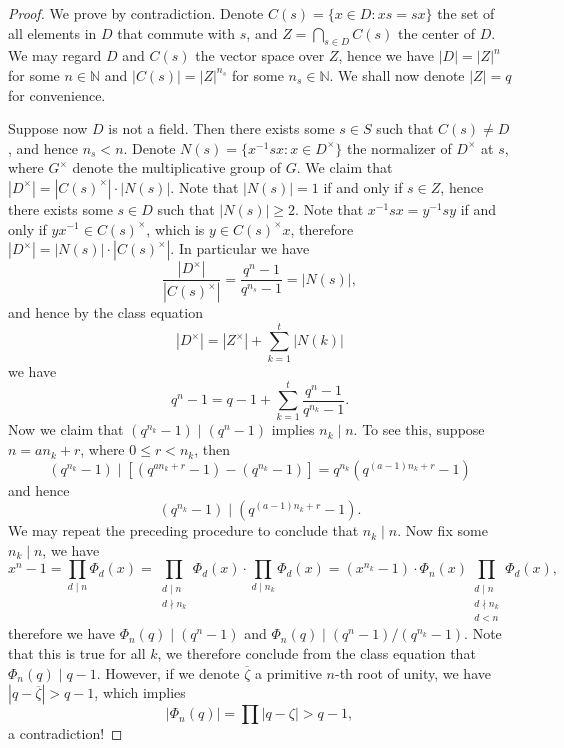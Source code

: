 \begin{proof}
We prove by contradiction. Denote $C(s)=\{x\in D:xs=sx\}$ the set of all elements in $D$ that commute with $s$, and $Z=\bigcap_{s\in D}C(s)$ the center of $D$. We may regard $D$ and $C(s)$ the vector space over $Z$, hence we have $|D|=|Z|^n$ for some $n\in\mathbb{N}$ and $|C(s)|=|Z|^{n_s}$ for some $n_s\in\mathbb{N}$. We shall now denote $|Z|=q$ for convenience.\par
Suppose now $D$ is not a field. Then there exists some $s\in S$ such that $C(s)\ne D$, and hence $n_s<n$. Denote $N(s)=\{x^{-1}sx:x\in D^\times\}$ the normalizer of $D^\times$ at $s$, where $G^\times$ denote the multiplicative group of $G$. We claim that $|D^\times|=|C(s)^\times|\cdot|N(s)|$. Note that $|N(s)|=1$ if and only if $s\in Z$, hence there exists some $s\in D$ such that $|N(s)|\ge 2$. Note that $x^{-1}sx=y^{-1}sy$ if and only if $yx^{-1}\in C(s)^\times$, which is $y\in C(s)^\times x$, therefore $|D^\times|=|N(s)|\cdot|C(s)^\times|$. In particular we have 
$$
\frac{\left| D^{\times} \right|}{\left| C\left( s \right) ^{\times} \right|}=\frac{q^n-1}{q^{n_s}-1}=\left| N\left( s \right) \right|,
$$
and hence by the class equation 
$$
\left| D^{\times} \right|=\left| Z^{\times} \right|+\sum_{k=1}^t{\left| N\left( k \right) \right|}
$$
we have 
$$
q^n-1=q-1+\sum_{k=1}^t{\frac{q^n-1}{q^{n_k}-1}}.
$$
Now we claim that $(q^{n_k}-1)\mid(q^n-1)$ implies $n_k\mid n$. To see this, suppose $n=an_k+r$, where $0\le r<n_k$, then 
$$
\left( q^{n_k}-1 \right) \mid \left[ \left( q^{an_k+r}-1 \right) -\left( q^{n_k}-1 \right) \right] =q^{n_k}\left( q^{\left( a-1 \right) n_k+r}-1 \right) 
$$
and hence 
$$
\left( q^{n_k}-1 \right) \mid \left( q^{\left( a-1 \right) n_k+r}-1 \right) .
$$
We may repeat the preceding procedure to conclude that $n_k\mid n$. Now fix some $n_k\mid n$, we have 
$$
x^n-1=\prod_{d\mid n}{\Phi _d\left( x \right)}=\prod_{\substack{d\mid n \\ d\nmid n_k}}\Phi _d\left( x \right)\cdot \prod_{d\mid n_k}{\Phi _d\left( x \right)}=\left( x^{n_k}-1 \right) \cdot \Phi _n\left( x \right) \prod_{\substack{d\mid n \\ d\nmid n_k \\ d<n}}\Phi _d\left( x \right),
$$
therefore we have $\Phi_n(q)\mid (q^n-1)$ and $\Phi_n(q)\mid(q^n-1)/(q^{n_k}-1)$. Note that this is true for all $k$, we therefore conclude from the class equation that $\Phi_n(q)\mid q-1$. However, if we denote $\overline{\zeta}$ a primitive $n$-th root of unity, we have $|q-\overline{\zeta}|>q-1$, which implies 
$$
\left| \Phi _n\left( q \right) \right|=\prod{\left| q-\zeta \right|}>q-1,
$$
a contradiction!
\end{proof}
